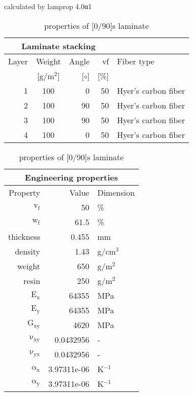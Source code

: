 \begin{table}[!htbp]
  \renewcommand{\arraystretch}{1.2}
  \caption{\label{tab:[0/90]s laminate}properties of [0/90]s laminate}
  \centering\footnotesize{\rule{0pt}{10pt}
  \tiny calculated by lamprop 4.0α1\\[3pt]}
    \begin{tabular}[t]{rcrrl}
      \multicolumn{4}{c}{\small\textbf{Laminate stacking}}\\[0.1em]
      \toprule %
      Layer & Weight & Angle & vf & Fiber type\\
            & [g/m$^2$] & [$\circ$] & [\%]\\
      \midrule
      1 &  100 &     0 & 50 & Hyer's carbon fiber\\
      2 &  100 &    90 & 50 & Hyer's carbon fiber\\
      3 &  100 &    90 & 50 & Hyer's carbon fiber\\
      4 &  100 &     0 & 50 & Hyer's carbon fiber\\
      \bottomrule
    \end{tabular}\hspace{0.02\textwidth}
    \begin{tabular}[t]{rrl}
      \multicolumn{3}{c}{\small\textbf{Engineering properties}}\\[0.1em]
      \toprule
      Property & Value & Dimension\\
      \midrule
      $\mathrm{v_f}$ & 50 &\%\\
      $\mathrm{w_f}$ & 61.5 &\%\\
      thickness & 0.455 & mm\\
      density & 1.43 & g/cm$^3$\\
      weight & 650 & g/m$^2$\\
      resin & 250 & g/m$^2$\\
      \midrule
      $\mathrm{E_x}$ &    64355 & MPa\\
      $\mathrm{E_y}$ &    64355 & MPa\\
      $\mathrm{G_{xy}}$ &     4620 & MPa\\
      $\mathrm{\nu_{xy}}$ & 0.0432956 &-\\
      $\mathrm{\nu_{yx}}$ & 0.0432956 &-\\
      $\mathrm{\alpha_x}$ & 3.97311e-06 & K$^{-1}$\\
      $\mathrm{\alpha_y}$ & 3.97311e-06 & K$^{-1}$\\
      \bottomrule
    \end{tabular}

\end{table}
